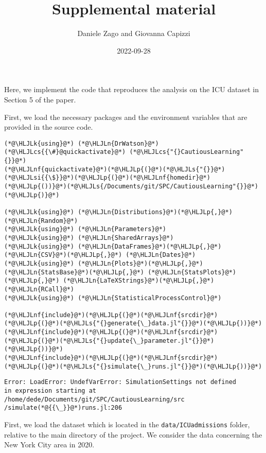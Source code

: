 \documentclass[12pt,a4paper]{article}
\title{ Supplemental material }
\author{ Daniele Zago and Giovanna Capizzi }
\date{ 2022-09-28 }
\newcommand{\HLJLk}[1]{\textcolor[RGB]{148,91,176}{\textbf{#1}}}
\newcommand{\HLJLn}[1]{#1}
\newcommand{\HLJLnf}[1]{\textcolor[RGB]{66,102,213}{#1}}
\newcommand{\HLJLs}[1]{\textcolor[RGB]{201,61,57}{#1}}
\newcommand{\HLJLsi}[1]{#1}
\newcommand{\HLJLp}[1]{#1}
\newcommand{\HLJLcs}[1]{\textcolor[RGB]{153,153,119}{\textit{#1}}}
\begin{document}
\maketitle

Here, we implement the code that reproduces the analysis on the ICU dataset in Section 5 of the paper.

First, we load the necessary packages and the environment variables that are provided in the source code.



\begin{lstlisting}
(*@\HLJLk{using}@*) (*@\HLJLn{DrWatson}@*)
(*@\HLJLcs{{\#}@quickactivate}@*) (*@\HLJLcs{"{}CautiousLearning"{}}@*)
(*@\HLJLnf{quickactivate}@*)(*@\HLJLp{(}@*)(*@\HLJLs{"{}}@*)(*@\HLJLsi{{\$}}@*)(*@\HLJLp{(}@*)(*@\HLJLnf{homedir}@*)(*@\HLJLp{())}@*)(*@\HLJLs{/Documents/git/SPC/CautiousLearning"{}}@*)(*@\HLJLp{)}@*)

(*@\HLJLk{using}@*) (*@\HLJLn{Distributions}@*)(*@\HLJLp{,}@*) (*@\HLJLn{Random}@*)
(*@\HLJLk{using}@*) (*@\HLJLn{Parameters}@*)
(*@\HLJLk{using}@*) (*@\HLJLn{SharedArrays}@*)
(*@\HLJLk{using}@*) (*@\HLJLn{DataFrames}@*)(*@\HLJLp{,}@*) (*@\HLJLn{CSV}@*)(*@\HLJLp{,}@*) (*@\HLJLn{Dates}@*)
(*@\HLJLk{using}@*) (*@\HLJLn{Plots}@*)(*@\HLJLp{,}@*) (*@\HLJLn{StatsBase}@*)(*@\HLJLp{,}@*) (*@\HLJLn{StatsPlots}@*)(*@\HLJLp{,}@*) (*@\HLJLn{LaTeXStrings}@*)(*@\HLJLp{,}@*) (*@\HLJLn{RCall}@*)
(*@\HLJLk{using}@*) (*@\HLJLn{StatisticalProcessControl}@*)

(*@\HLJLnf{include}@*)(*@\HLJLp{(}@*)(*@\HLJLnf{srcdir}@*)(*@\HLJLp{(}@*)(*@\HLJLs{"{}generate{\_}data.jl"{}}@*)(*@\HLJLp{))}@*)
(*@\HLJLnf{include}@*)(*@\HLJLp{(}@*)(*@\HLJLnf{srcdir}@*)(*@\HLJLp{(}@*)(*@\HLJLs{"{}update{\_}parameter.jl"{}}@*)(*@\HLJLp{))}@*)
(*@\HLJLnf{include}@*)(*@\HLJLp{(}@*)(*@\HLJLnf{srcdir}@*)(*@\HLJLp{(}@*)(*@\HLJLs{"{}simulate{\_}runs.jl"{}}@*)(*@\HLJLp{))}@*)
\end{lstlisting}

\begin{lstlisting}
Error: LoadError: UndefVarError: SimulationSettings not defined
in expression starting at /home/dede/Documents/git/SPC/CautiousLearning/src
/simulate(*@{{\_}}@*)runs.jl:206
\end{lstlisting}


First, we load the dataset which is located in the \texttt{data/ICUadmissions} folder, relative to the main directory of the project. We consider the data concerning the New York City area in 2020.
\end{document}

